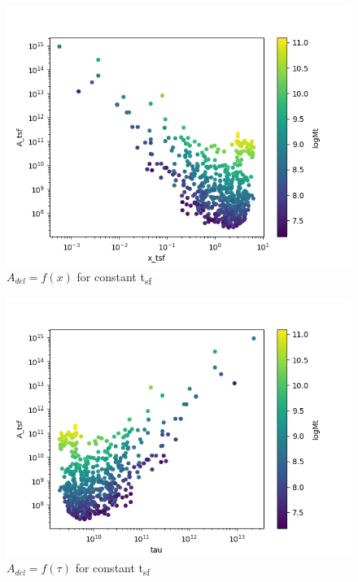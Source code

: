 \documentclass[a4paper,twocolumn]{article}
\begin{document}
\begin{figure}[!htpb]
\centering
\includegraphics[width=.9\linewidth]{./figs/x-A_tsf.png}
\caption{\label{fig:$A_{del} = f(x)$ for constant t_{sf}}\(A_{del} = f(x)\) for constant t\textsubscript{sf}}
\end{figure}

\begin{figure}[!htpb]
\centering
\includegraphics[width=.9\linewidth]{./figs/T-A_tsf.png}
\caption{\label{fig:$A_{del} = f(\tau)$ for constant t_{sf}}\(A_{del} = f(\tau)\) for constant t\textsubscript{sf}}
\end{figure}
\end{document}
